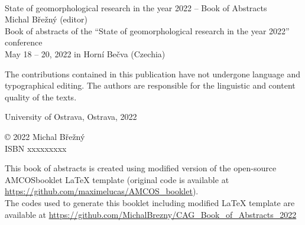 \documentclass[
	openany, %
	parskip=false, %
	12pt, %
	a4paper, %
]{conferencebooklet} %
\begin{document}



\thispagestyle{empty} %

~\vfill %


\begin{flushleft}	
\vspace{2em}
State of geomorphological research in the year 2022 -- Book of Abstracts\\
Michal Břežný (editor)\\
\vspace{2em}
Book of abstracts of the \enquote{State of geomorphological research in the year 2022} conference\\
May 18 – 20, 2022 in Horní Bečva (Czechia)\\
\vspace{2em}

The contributions contained in this publication have not undergone language and typographical editing. The authors are responsible for the linguistic and content quality of the texts.
\\ \vspace{2em}

University of Ostrava, Ostrava, 2022 \\\vspace{2em}

© 2022 Michal Břežný\\
\vspace{2em}
ISBN xxxxxxxxx\\

\vspace{5em}





This book of abstracts is created using  modified version of the open-source AMCOS\textunderscore booklet \LaTeX{} template (original code is available at  \url{https://github.com/maximelucas/AMCOS\_booklet}).\\
The codes used to generate this booklet including modified \LaTeX{} template are available at \url{https://github.com/MichalBrezny/CAG_Book_of_Abstracts_2022}

\end{flushleft}
\end{document}
